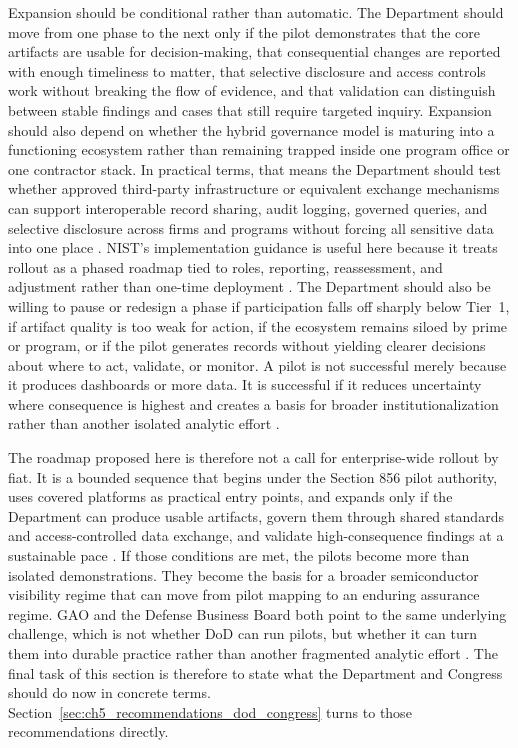 Expansion should be conditional rather than automatic. The Department should move from one phase to the next only if the pilot demonstrates that the core artifacts are usable for decision-making, that consequential changes are reported with enough timeliness to matter, that selective disclosure and access controls work without breaking the flow of evidence, and that validation can distinguish between stable findings and cases that still require targeted inquiry. Expansion should also depend on whether the hybrid governance model is maturing into a functioning ecosystem rather than remaining trapped inside one program office or one contractor stack. In practical terms, that means the Department should test whether approved third-party infrastructure or equivalent exchange mechanisms can support interoperable record sharing, audit logging, governed queries, and selective disclosure across firms and programs without forcing all sensitive data into one place \parencite{ch5_nist_ir_8536_2,ch5_nist_ir_8419}. NIST's implementation guidance is useful here because it treats rollout as a phased roadmap tied to roles, reporting, reassessment, and adjustment rather than one-time deployment \parencite{ch5_nist800161r1upd1}. The Department should also be willing to pause or redesign a phase if participation falls off sharply below Tier~1, if artifact quality is too weak for action, if the ecosystem remains siloed by prime or program, or if the pilot generates records without yielding clearer decisions about where to act, validate, or monitor. A pilot is not successful merely because it produces dashboards or more data. It is successful if it reduces uncertainty where consequence is highest and creates a basis for broader institutionalization rather than another isolated analytic effort \parencite{U.S.GovernmentAccountabilityOffice2025,ch5_dbb2025_illumination}.

The roadmap proposed here is therefore not a call for enterprise-wide rollout by fiat. It is a bounded sequence that begins under the Section 856 pilot authority, uses covered platforms as practical entry points, and expands only if the Department can produce usable artifacts, govern them through shared standards and access-controlled data exchange, and validate high-consequence findings at a sustainable pace \parencite{ch5_ndaa2024_sec856,ch5_nist800161r1upd1}. If those conditions are met, the pilots become more than isolated demonstrations. They become the basis for a broader semiconductor visibility regime that can move from pilot mapping to an enduring assurance regime. GAO and the Defense Business Board both point to the same underlying challenge, which is not whether DoD can run pilots, but whether it can turn them into durable practice rather than another fragmented analytic effort \parencite{U.S.GovernmentAccountabilityOffice2025,ch5_dbb2025_illumination}. The final task of this section is therefore to state what the Department and Congress should do now in concrete terms. Section~\ref{sec:ch5_recommendations_dod_congress} turns to those recommendations directly.

